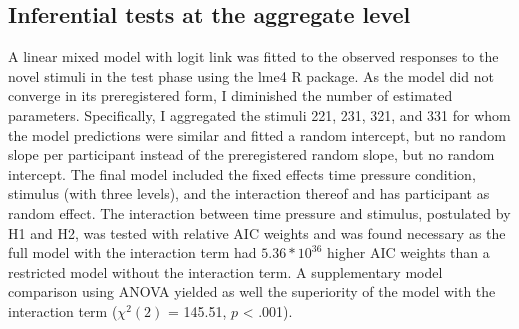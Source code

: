 \documentclass[a4paper,man,natbib]{apa6}
\begin{document}
\subsection{Inferential tests at the aggregate level}
A linear mixed model with logit link was fitted to the observed responses to the novel stimuli in the test phase using the lme4 R package. As the model did not converge in its preregistered form, I diminished the number of estimated parameters. Specifically, I aggregated the stimuli 221, 231, 321, and 331 for whom the model predictions were similar and fitted a random intercept, but no random slope per participant instead of the preregistered random slope, but no random intercept. The final model included the fixed effects time pressure condition, stimulus (with three levels), and the interaction thereof and has participant as random effect. The interaction between time pressure and stimulus, postulated by H1 and H2, was tested with relative AIC weights \citep[][p. 194]{wagenmakers2004aic} and was found necessary as the full model with the interaction term had $5.36 * 10^{36}$ higher AIC weights than a restricted model without the interaction term. A supplementary model comparison using ANOVA yielded as well the superiority of the model with the interaction term ($\chi^{2}(2)$ = 145.51, $p$ < .001). 
\end{document}
